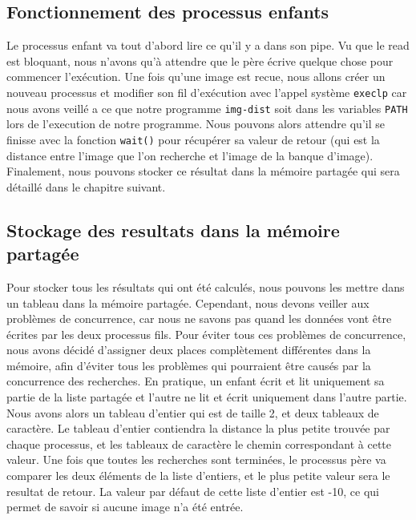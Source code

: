 \documentclass[french]{article}
\begin{document}
\subsection{Fonctionnement des processus enfants}
Le processus enfant va tout d'abord lire ce qu'il y a dans son pipe. Vu que le read est bloquant, nous n'avons qu'à attendre que le père écrive quelque chose pour 
commencer l'exécution. Une fois qu'une image est recue, nous allons créer un nouveau processus et modifier son fil d'exécution avec l'appel système \texttt{execlp} 
car nous avons veillé a ce que notre programme \texttt{img-dist} soit dans les variables \texttt{PATH} lors de l'execution de notre programme. Nous pouvons alors 
attendre qu'il se finisse avec la fonction \texttt{wait()} pour récupérer sa valeur de retour (qui est la distance entre l'image que l'on recherche et l'image 
de la banque d'image). Finalement, nous pouvons stocker ce résultat dans la mémoire partagée qui sera détaillé dans le chapitre suivant. 

\subsection{Stockage des resultats dans la mémoire partagée}
Pour stocker tous les résultats qui ont été calculés, nous pouvons les mettre dans un tableau dans la mémoire partagée. Cependant, nous devons veiller aux problèmes 
de concurrence, car nous ne savons pas quand les données vont être écrites par les deux processus fils. Pour éviter tous ces problèmes de concurrence, nous avons décidé
d'assigner deux places complètement différentes dans la mémoire, afin d'éviter tous les problèmes qui pourraient être causés par la concurrence des recherches. En pratique,
un enfant écrit et lit uniquement sa partie de la liste partagée et l'autre ne lit et écrit uniquement dans l'autre partie. Nous avons alors un tableau d'entier qui est 
de taille 2, et deux tableaux de caractère. Le tableau d'entier contiendra la distance la plus petite trouvée par chaque processus, et les tableaux de caractère le chemin 
correspondant à cette valeur. Une fois que toutes les recherches sont terminées, le processus père va comparer les deux éléments de la liste d'entiers, et le plus petite 
valeur sera le resultat de retour. La valeur par défaut de cette liste d'entier est -10, ce qui permet de savoir si aucune image n'a été entrée.  
\end{document}
